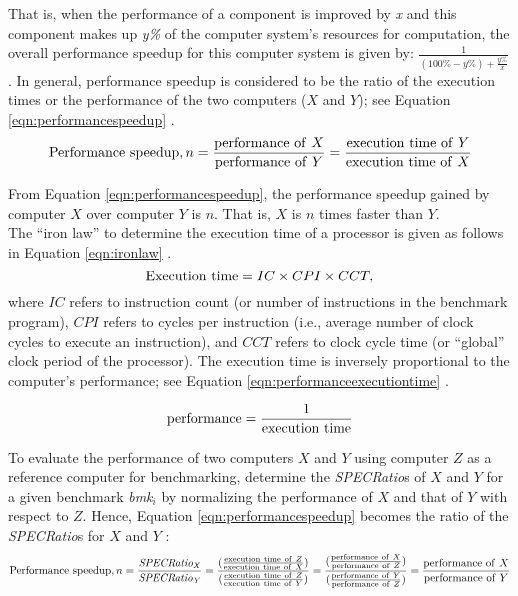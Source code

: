 That is, when the performance of a component is improved by {\it x} and this component makes up {\it y\%} of the computer system's resources for computation, the overall performance speedup for this computer system is given by: $\frac{1}{(100\% - y\%) + \frac{y\%}{x}}$. In general, performance speedup is considered to be the ratio of the execution times or the performance of the two computers ($X$ and $Y$); see Equation \ref{eqn:performancespeedup} \cite{Hennessy2012}. \\

\begin{equation}
\label{eqn:performancespeedup}
{\rm Performance\ speedup}, n = \frac{{\rm performance\ of\ }X}{{\rm performance\ of\ }Y} = \frac{{\rm execution\ time\ of\ }Y}{{\rm execution\ time\ of\ }X}
\end{equation}

From Equation \ref{eqn:performancespeedup}, the performance speedup gained by computer $X$ over computer $Y$ is $n$. That is, $X$ is $n$ times faster than $Y$. \\

The ``iron law'' \cite{Shen2005a} to determine the execution time of a processor is given as follows in Equation \ref{eqn:ironlaw} \cite{Hennessy2012}.
\begin{equation}
\label{eqn:ironlaw}
{\rm Execution\ time} = IC \times CPI \times CCT,
\end{equation}
where $IC$ refers to instruction count (or number of instructions in the benchmark program), $CPI$ refers to cycles per instruction (i.e., average number of clock cycles to execute an instruction), and $CCT$ refers to clock cycle time (or ``global'' clock period of the processor). The execution time is inversely proportional to the computer's performance; see Equation \ref{eqn:performanceexecutiontime} \cite{Patterson2005}.

\begin{equation}
\label{eqn:performanceexecutiontime}
{\rm performance} = \frac{1}{\rm execution\ time}
\end{equation}

To evaluate the performance of two computers $X$ and $Y$ using computer $Z$ as a reference computer for benchmarking, determine the {\it SPECRatio}s of $X$ and $Y$ for a given benchmark {\it bmk}$_{i}$ by normalizing the performance of $X$ and that of $Y$ with respect to $Z$. Hence, Equation \ref{eqn:performancespeedup} becomes the ratio of the {\it SPECRatio}s for $X$ and $Y$ \cite{Hennessy2012}:
\begin{equation}
\label{eqn:specratioxy}
{\rm Performance\ speedup}, n = \frac{\it SPECRatio_{X}}{\it SPECRatio_{Y}} = \frac{(\frac{{\rm execution\ time\ of\ }Z}{{\rm execution\ time\ of\ }X})}{(\frac{{\rm execution\ time\ of\ }Z}{{\rm execution\ time\ of\ }Y})} = \frac{(\frac{{\rm performance\ of\ }X}{{\rm performance\ of\ }Z})}{(\frac{{\rm performance\ of\ }Y}{{\rm performance\ of\ }Z})} = \frac{{\rm performance\ of}\ X}{{\rm performance\ of}\ Y}
\end{equation}

